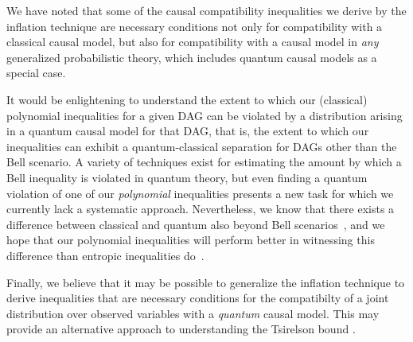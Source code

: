{We have noted that some of the causal compatibility inequalities we derive by the inflation technique are necessary conditions not only for compatibility with a classical causal model, but also 
for compatibility with a causal model in {\em any} generalized probabilistic theory, which includes quantum causal models as a special case.  


It would be enlightening to understand the extent to which our (classical) polynomial inequalities for a given DAG can be violated by a distribution arising in a quantum causal model for that DAG, that is, the extent to which our inequalities can exhibit  a quantum-classical separation for DAGs other than the Bell scenario.  A variety of techniques exist for estimating the amount by which a Bell inequality \cite{NPA2008Long,I3322NPA1} is violated in quantum theory, but even finding a quantum violation of one of our \emph{polynomial} inequalities presents a new task for which we currently lack a systematic approach. Nevertheless, we know that there exists a difference between classical and quantum also beyond Bell scenarios~\cite[Theorem~2.16]{fritz2012bell}, and we hope that our polynomial inequalities will perform better in witnessing this difference than entropic inequalities do~\cite{pusey2014gdag,Chaves2015infoquantum}.

Finally, we believe that it may be possible to generalize the inflation technique to derive inequalities that are necessary conditions for the compatibilty of a joint distribution over observed variables with a {\em quantum} causal model.  This may provide an alternative approach to understanding the Tsirelson bound \cite{Brunner2013Bell}.

}
